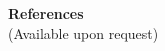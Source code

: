 \documentclass[12pt]{extarticle}
\begin{document}
% 
% 
% 
%   




%
%
%
%
%


\vspace*{2mm}
{\bf\Large Refer\textcolor{azul}{ences}}\\
(Available upon request)
\end{document}
